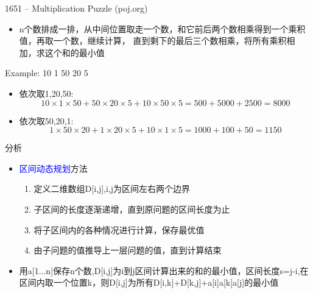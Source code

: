 \begin{frame}{1651 -- Multiplication Puzzle (poj.org)}
    \begin{itemize}
        \item n个数排成一排，从中间位置取走一个数，和它前后两个数相乘得到一个乘积值，再取一个数，继续计算， 直到剩下的最后三个数相乘，将所有乘积相加，求这个和的最小值
    \end{itemize}
    \vfill
    \begin{exampleblock}{Example: 10 1 50 20 5}
        \begin{itemize}
            \item 依次取1,20,50:
            $$10\times 1\times 50+50\times 20\times 5+10\times 50\times 5=500+5000+2500=8000$$
            \item 依次取50,20,1:
            $$1\times 50\times 20+1\times 20\times 5+10\times 1\times 5=1000+100+50=1150$$
        \end{itemize}
    \end{exampleblock}
\end{frame}
\begin{frame}{分析}
    \begin{itemize}
        \item \textcolor{blue}{区间动态规划}方法
        \begin{enumerate}[(1)]
            \item 定义二维数组D[i,j],i,j为区间左右两个边界
            \item 子区间的长度逐渐递增，直到原问题的区间长度为止
            \item 将子区间内的各种情况进行计算，保存最优值
            \item 由子问题的值推导上一层问题的值，直到计算结束
        \end{enumerate}
        \vfill
        \item 用a[1...n]保存n个数,D[i,j]为i到j区间计算出来的和的最小值，区间长度s=j-i,在区间内取一个位置k，则D[i,j]为所有D[i,k]+D[k,j]+a[i]\times a[k]\times a[j]的最小值
    \end{itemize}
\end{frame}

